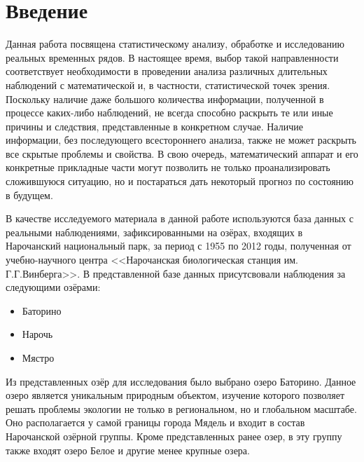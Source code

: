 \newpage

\chapter*{Введение}

Данная работа посвящена статистическому анализу, обработке и исследованию реальных временных рядов. В настоящее время, выбор такой направленности соответствует необходимости в проведении анализа различных длительных наблюдений с математической и, в частности, статистической точек зрения. Поскольку наличие даже большого количества информации, полученной в процессе каких-либо наблюдений, не всегда способно раскрыть те или иные причины и следствия, представленные в конкретном случае. Наличие информации, без последующего всестороннего анализа, также не может раскрыть все скрытые проблемы и свойства. В свою очередь, математический аппарат и его конкретные прикладные части могут позволить не только проанализировать сложившуюся ситуацию, но и постараться дать некоторый прогноз по состоянию в будущем.

В качестве исследуемого материала в данной работе используются база данных с реальными наблюдениями, зафиксированными на озёрах, входящих в Нарочанский национальный парк, за период с 1955 по 2012 годы, полученная от учебно-научного центра <<Нарочанская биологическая станция им. Г.Г.Винберга>>. В представленной базе данных присутсвовали наблюдения за следующими озёрами:
\begin{itemize}
\item Баторино
\item Нарочь
\item Мястро
\end{itemize}
Из представленных озёр для исследования было выбрано озеро Баторино. Данное озеро является уникальным природным объектом, изучение которого позволяет решать проблемы экологии не только в региональном, но и глобальном масштабе. Оно располагается у самой границы города Мядель и входит в состав Нарочанской озёрной группы. Кроме представленных ранее озер, в эту группу также входят озеро Белое и другие менее крупные озера.


